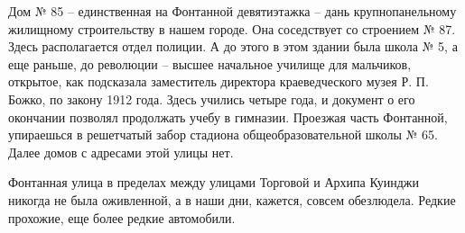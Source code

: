 Дом № 85 – единственная на Фонтанной девятиэтажка – дань крупнопанельному
жилищному строительству в нашем городе. Она соседствует со строением № 87.
Здесь располагается отдел полиции. А до этого в этом здании была школа № 5, а
еще раньше, до революции – высшее начальное училище для мальчиков, открытое,
как подсказала заместитель директора краеведческого музея Р. П. Божко, по закону
1912 года. Здесь учились четыре года, и документ о его окончании позволял
продолжать учебу в гимназии. Проезжая часть Фонтанной, упираешься в решетчатый
забор стадиона общеобразовательной школы № 65. Далее домов с адресами этой
улицы нет.

Фонтанная улица в пределах между улицами Торговой и Архипа Куинджи никогда не
была оживленной, а в наши дни, кажется, совсем обезлюдела. Редкие прохожие, еще
более редкие автомобили.
